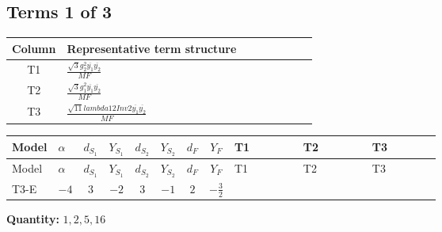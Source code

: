 \documentclass[8pt]{article}
\begin{document}
\begin{landscape}
\subsection*{Terms 1 of 3}
\begin{center}
\begin{tabular}{@{}c >{\raggedright\arraybackslash}p{0.82\linewidth}@{}}
\toprule
Column & Representative term structure \\
\midrule
T1 & \(\displaystyle \frac{\sqrt{3} g_{2}^{2} \overline{y_{1}} \overline{y_{2}}}{MF}\) \\
\midrule
T2 & \(\displaystyle \frac{\sqrt{3} g_{1}^{2} \overline{y_{1}} \overline{y_{2}}}{MF}\) \\
\midrule
T3 & \(\displaystyle \frac{\sqrt{11} lambda12Inv2 \overline{y_{1}} \overline{y_{2}}}{MF}\) \\
\midrule
\bottomrule
\end{tabular}
\end{center}
\smallskip
\tiny
\begin{longtable}{@{}llcccccc >{\raggedright\arraybackslash}p{0.21\linewidth} >{\raggedright\arraybackslash}p{0.21\linewidth} >{\raggedright\arraybackslash}p{0.21\linewidth}@{}}
\toprule
Model & $\alpha$ & $d_{S_1}$ & $Y_{S_1}$ & $d_{S_2}$ & $Y_{S_2}$ & $d_F$ & $Y_F$ & T1 & T2 & T3 \\
\midrule
\endfirsthead
\toprule
Model & $\alpha$ & $d_{S_1}$ & $Y_{S_1}$ & $d_{S_2}$ & $Y_{S_2}$ & $d_F$ & $Y_F$ & T1 & T2 & T3 \\
\midrule
\endhead
T3-E & $-4$ & $3$ & $-2$ & $3$ & $-1$ & $2$ & $-\frac{3}{2}$ & \scriptsize\adjustbox{max width=\linewidth}{$\begin{gathered} - \frac{15 \sqrt{3} g_{2}^{2} \overline{y_{1}} \overline{y_{2}}}{8 MF}\end{gathered}$} & \scriptsize\adjustbox{max width=\linewidth}{$\begin{gathered} - \frac{9 \sqrt{3} g_{1}^{2} \overline{y_{1}} \overline{y_{2}}}{8 MF}\end{gathered}$} & \scriptsize\adjustbox{max width=\linewidth}{$\begin{gathered} - \frac{3 \sqrt{11} lambda12Inv2 \overline{y_{1}} \overline{y_{2}}}{22 MF}\end{gathered}$} \\
\midrule
\bottomrule
\end{longtable}
\clearpage
\noindent\textbf{Quantity: }$\mathrm{1,2,5,16}$\par\smallskip

\end{landscape}
\end{document}

